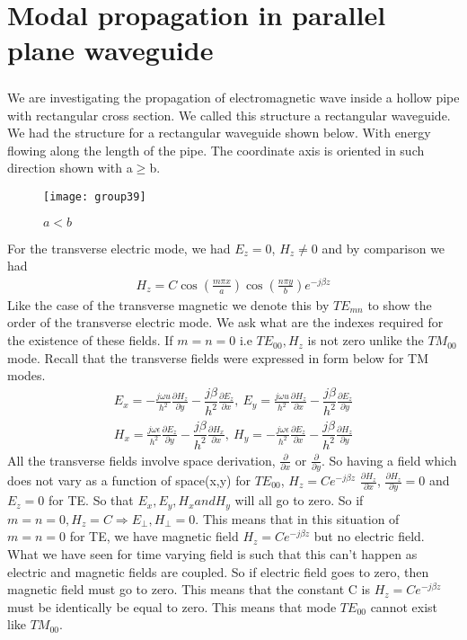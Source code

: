 \chapter{Modal propagation in parallel plane waveguide}
	\paragraph{}
	We are investigating the propagation of electromagnetic wave inside a hollow pipe with rectangular cross section. We called this structure a rectangular waveguide. We had the structure for a rectangular waveguide shown below. With energy flowing along the length of the pipe. The coordinate axis is oriented in such direction shown with a$\geq$b.
	\begin{figure}[h]
		\centering
		\texttt{[image: group39]}
		\caption{$a<b$}
	\end{figure}
	For the transverse electric mode, we had $E_z = 0$, $H_z \neq 0$ and by comparison we had 
	\begin{align*}
	H_z = C\cos(\frac{m\pi x}{a}) \cos(\frac{n\pi y}{b})e^{-j\beta z}
	\end{align*}
	Like the case of the transverse magnetic we denote this by $TE_{mn}$ to show the order of the transverse electric mode. We ask what are the indexes required for the existence of these fields. If $m = n = 0$ i.e $TE_{00},H_z$ is not zero unlike the $TM_{00}$ mode. Recall that the transverse fields were expressed in form below for TM modes.
	\begin{align*}
	E_x = -\frac{j\omega u}{h^2}\frac{\partial H_z}{\partial y} - \dfrac{j\beta}{h^2}\frac{\partial E_z}{\partial x}, \
	E_y = \frac{j\omega u}{h^2}\frac{\partial H_z}{\partial x} - \dfrac{j\beta}{h^2}\frac{\partial E_z}{\partial y}\\
	H_x = \frac{j\omega \epsilon}{h^2}\frac{\partial E_z}{\partial y} - \dfrac{j\beta}{h^2}\frac{\partial H_x}{\partial x}, \
	H_y = -\frac{j\omega \epsilon}{h^2}\frac{\partial E_z}{\partial x} - \dfrac{j\beta}{h^2}\frac{\partial H_z}{\partial y}
	\end{align*}
	All the transverse fields involve space derivation, $\frac{\partial}{\partial x}$ or $\frac{\partial}{\partial y}$. So having a field which does not vary as a function of space(x,y) for $TE_{00}$, $H_z = Ce^{-j\beta z}$  $\frac{\partial H_z}{\partial x}$,  $\frac{\partial H_z}{\partial y} = 0$ and $E_z = 0$ for TE. So that $E_x, E_y, H_x and H_y$ will all go to zero. So if $m = n = 0, H_z = C \Rightarrow E_\bot , H_\bot = 0$.
	This means that in this situation of $m = n = 0$ for TE, we have magnetic field $H_z = Ce^{-j\beta z}$ but no electric field. What we have seen for time varying field is such that this can't happen as electric and magnetic fields are coupled. So if electric field goes to zero, then magnetic field must go to zero. This means that the constant C is $H_z = Ce^{-j\beta z}$ must be identically be equal to zero. This means that mode $TE_{00}$ cannot exist like $TM_{00}$.
